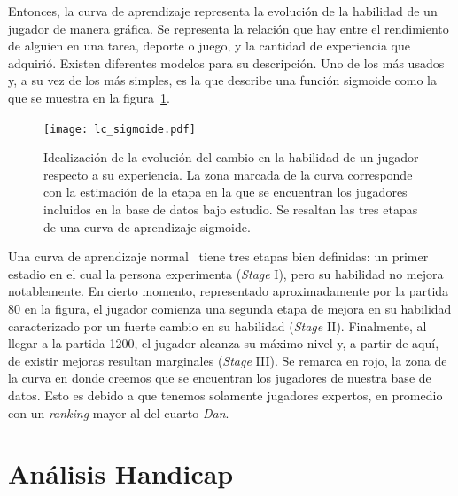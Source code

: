 \documentclass[11pt,twoside,spanish]{report} %
\begin{document}
Entonces, la curva de aprendizaje representa la evoluci\'on de la habilidad de un jugador de manera gr\'afica.
Se representa la relaci\'on que hay entre el rendimiento de alguien en una tarea, deporte o juego, y la cantidad de experiencia que adquiri\'o.
Existen diferentes modelos para su descripci\'on.
Uno de los m\'as usados y, a su vez de los m\'as simples, es la que describe una funci\'on sigmoide como la que se muestra en la figura~\ref{fig:lc_sigmoide}.

\begin{figure}[H]
	\centering
	\texttt{[image: lc\_sigmoide.pdf]}
	\caption{Idealizaci\'on de la evoluci\'on del cambio en la habilidad de un jugador respecto a su experiencia. La zona marcada de la curva corresponde con la estimaci\'on de la etapa en la que se encuentran los jugadores incluidos en la base de datos bajo estudio.
	Se resaltan las tres etapas de una curva de aprendizaje sigmoide.}
	\label{fig:lc_sigmoide}
\end{figure}




Una curva de aprendizaje normal~\cite{newell1981-skillAcquisitionAndLawOfPractice} tiene tres etapas bien definidas: un primer estadio en el cual la persona experimenta (\textit{Stage} I), pero su habilidad no mejora notablemente.
En cierto momento, representado aproximadamente por la partida 80 en la figura, el jugador comienza una segunda etapa de mejora en su habilidad caracterizado por un fuerte cambio en su habilidad (\textit{Stage} II).
Finalmente, al llegar a la partida 1200, el jugador alcanza su m\'aximo nivel y, a partir de aqu\'i, de existir mejoras resultan marginales (\textit{Stage} III).
Se remarca en rojo, la zona de la curva en donde creemos que se encuentran los jugadores de nuestra base de datos.
Esto es debido a que tenemos solamente jugadores expertos, en promedio con un \textit{ranking} mayor al del cuarto \textit{Dan}.




\section{An\'alisis Handicap}
\label{chap:handicap}
\end{document}
